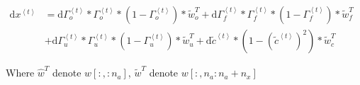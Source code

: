 \documentclass[
]{article}
\begin{document}
\(\begin{aligned}\mathrm{d} x^{\left\langle t\right\rangle}&= \mathrm{d}\Gamma_{o}^{\left\langle t\right\rangle}*\Gamma_{o}^{\left\langle t\right\rangle}*(1-\Gamma_{o}^{\left\langle t\right\rangle})*\tilde{w}_o^T + \mathrm{d}\Gamma_{f}^{\left\langle t\right\rangle}*\Gamma_{f}^{\left\langle t\right\rangle}*(1-\Gamma_{f}^{\left\langle t\right\rangle})*\tilde{w}_f^T \\&+\mathrm{d}\Gamma_{u}^{\left\langle t\right\rangle}*\Gamma_{u}^{\left\langle t\right\rangle}*(1-\Gamma_{u}^{\left\langle t\right\rangle})*\tilde{w}_u^T+\mathrm{d}\tilde{c}^{\left\langle t\right\rangle}*(1-(\tilde{c}^{\left\langle t\right\rangle})^2)*\tilde{w}_c^T\end{aligned}\)

Where \(\hat{w}^T\) denote \(w[:, :n_a]\), \(\tilde{w}^T\) denote
\(w[:, n_a:n_a+n_x]\)
\end{document}
